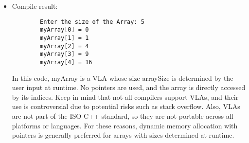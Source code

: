 \documentclass{book}
\begin{document}
\begin{itemize}
      Example of declare an array with out useing pointers and still set its length at runtime(Using  Variable Length Arrays (VLA)):
      \begin{lstlisting}
        #include <stdio.h>

        int main(){
                int arraySize;
        
                //Ask the user for the array size:
                printf("Enter the size of the array: ");
                scanf("%d", &arraySize);
        
                //declare VLA based on the user input:
                int myArray[arraySize];
        
                //Intitialize array with values
                for (int i = 0; i < arraySize; i++){
                        myArray[i] = i * i;
                }
        
                //Print array values:
                for (int i = 0; i < arraySize; i++){
                        printf("myArray[%d] = %d\n", i, myArray[i]);
                }
        
                return 0;
        }
      \end{lstlisting}
      \item Compile result:
      \begin{lstlisting}
        Enter the size of the Array: 5
        myArray[0] = 0
        myArray[1] = 1
        myArray[2] = 4
        myArray[3] = 9
        myArray[4] = 16
      \end{lstlisting}
      In this code, myArray is a VLA whose size arraySize is determined by the user input at runtime. No pointers are used, and the array is directly accessed by its indices.
      Keep in mind that not all compilers support VLAs, and their use is controversial due to potential risks such as stack overflow. Also, VLAs are not part of the ISO C++ standard, so they are not portable across all platforms or languages. For these reasons, dynamic memory allocation with pointers is generally preferred for arrays with sizes determined at runtime.
    \end{itemize} 




 
   
    
    
    
\end{document}
